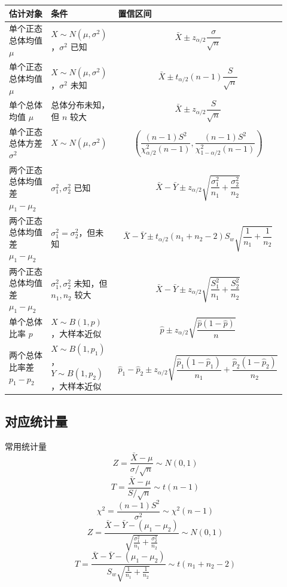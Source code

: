 \documentclass[UTF8,zihao=-4,fontset=fandol]{ctexart}
\begin{document}
\begin{longtable}{p{0.23\linewidth}p{0.27\linewidth}p{0.42\linewidth}}
\toprule
\textbf{估计对象} & \textbf{条件} & \textbf{置信区间} \\
\midrule
单个正态总体均值 $\mu$
&
$X\sim N(\mu,\sigma^2)$，$\sigma^2$ 已知
&
\[
\bar{X}\pm z_{\alpha/2}\frac{\sigma}{\sqrt{n}}
\]
\\
\addlinespace
单个正态总体均值 $\mu$
&
$X\sim N(\mu,\sigma^2)$，$\sigma^2$ 未知
&
\[
\bar{X}\pm t_{\alpha/2}(n-1)\frac{S}{\sqrt{n}}
\]
\\
\addlinespace
单个总体均值 $\mu$
&
总体分布未知，但 $n$ 较大
&
\[
\bar{X}\pm z_{\alpha/2}\frac{S}{\sqrt{n}}
\]
\\
\addlinespace
单个正态总体方差 $\sigma^2$
&
$X\sim N(\mu,\sigma^2)$
&
\[
\left(
\frac{(n-1)S^2}{\chi^2_{\alpha/2}(n-1)},
\frac{(n-1)S^2}{\chi^2_{1-\alpha/2}(n-1)}
\right)
\]
\\
\addlinespace
两个正态总体均值差 $\mu_1-\mu_2$
&
$\sigma_1^2,\sigma_2^2$ 已知
&
\[
\bar{X}-\bar{Y}
\pm z_{\alpha/2}
\sqrt{\frac{\sigma_1^2}{n_1}+\frac{\sigma_2^2}{n_2}}
\]
\\
\addlinespace
两个正态总体均值差 $\mu_1-\mu_2$
&
$\sigma_1^2=\sigma_2^2$，但未知
&
\[
\bar{X}-\bar{Y}
\pm t_{\alpha/2}(n_1+n_2-2)S_w
\sqrt{\frac{1}{n_1}+\frac{1}{n_2}}
\]
\\
\addlinespace
两个正态总体均值差 $\mu_1-\mu_2$
&
$\sigma_1^2,\sigma_2^2$ 未知，但 $n_1,n_2$ 较大
&
\[
\bar{X}-\bar{Y}
\pm z_{\alpha/2}
\sqrt{\frac{S_1^2}{n_1}+\frac{S_2^2}{n_2}}
\]
\\
\addlinespace
单个总体比率 $p$
&
$X\sim B(1,p)$，大样本近似
&
\[
\hat{p}\pm z_{\alpha/2}
\sqrt{\frac{\hat{p}(1-\hat{p})}{n}}
\]
\\
\addlinespace
两个总体比率差 $p_1-p_2$
&
$X\sim B(1,p_1)$，$Y\sim B(1,p_2)$，大样本近似
&
\[
\hat{p}_1-\hat{p}_2
\pm z_{\alpha/2}
\sqrt{
\frac{\hat{p}_1(1-\hat{p}_1)}{n_1}
+\frac{\hat{p}_2(1-\hat{p}_2)}{n_2}
}
\]
\\
\bottomrule
\end{longtable}

\subsection{对应统计量}

\begin{keybox}{常用统计量}
\[
Z=\frac{\bar{X}-\mu}{\sigma/\sqrt{n}}\sim N(0,1)
\]
\[
T=\frac{\bar{X}-\mu}{S/\sqrt{n}}\sim t(n-1)
\]
\[
\chi^2=\frac{(n-1)S^2}{\sigma^2}\sim \chi^2(n-1)
\]
\[
Z=
\frac{\bar{X}-\bar{Y}-(\mu_1-\mu_2)}
{\sqrt{\frac{\sigma_1^2}{n_1}+\frac{\sigma_2^2}{n_2}}}
\sim N(0,1)
\]
\[
T=
\frac{\bar{X}-\bar{Y}-(\mu_1-\mu_2)}
{S_w\sqrt{\frac{1}{n_1}+\frac{1}{n_2}}}
\sim t(n_1+n_2-2)
\]
\end{keybox}
\end{document}
